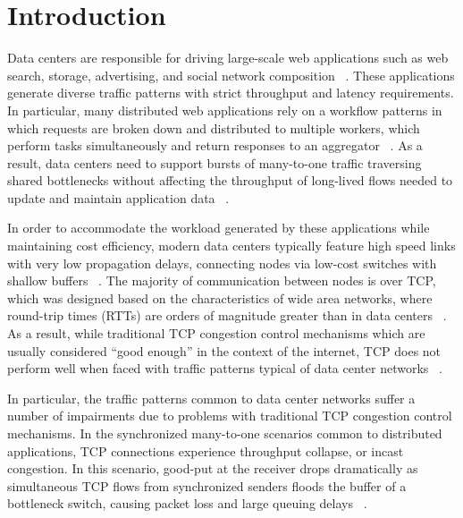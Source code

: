 \section{Introduction}

Data centers are responsible for driving large-scale web applications such as web search, storage, advertising, and social network composition ~\cite{chen_understanding_2009, alizadeh_data_2010}. These applications generate diverse traffic patterns with strict throughput and latency requirements. In particular, many distributed web applications rely on a workflow patterns in which requests are broken down and distributed to multiple workers, which perform tasks simultaneously and return responses to an aggregator ~\cite{chen_understanding_2009, alizadeh_data_2010}. As a result, data centers need to support bursts of many-to-one traffic traversing shared bottlenecks without affecting the throughput of long-lived flows needed to update and maintain application data ~\cite{alizadeh_data_2010}.

In order to accommodate the workload generated by these applications while maintaining cost efficiency, modern data centers typically feature high speed links with very low propagation delays, connecting nodes via low-cost switches with shallow buffers ~\cite{chen_understanding_2009, hamilton_designing_2007, alizadeh_data_2010}. The majority of communication between nodes is over TCP, which was designed based on the characteristics of wide area networks, where round-trip times (RTTs) are orders of magnitude greater than in data centers ~\cite{chen_understanding_2009}. As a result, while traditional TCP congestion control mechanisms which are usually considered ``good enough'' in the context of the internet, TCP does not perform well when faced with traffic patterns typical of data center networks ~\cite{chen_understanding_2009, phanishayee_measurement_2008}. 

In particular, the traffic patterns common to data center networks suffer a number of impairments due to problems with traditional TCP congestion control mechanisms. In the synchronized many-to-one scenarios common to distributed applications, TCP connections experience throughput collapse, or incast congestion. In this scenario, good-put at the receiver drops dramatically as simultaneous TCP flows from synchronized senders floods the buffer of a bottleneck switch, causing packet loss and large queuing delays ~\cite{chen_understanding_2009, phanishayee_measurement_2008, dean_mapreduce:_2004}.

